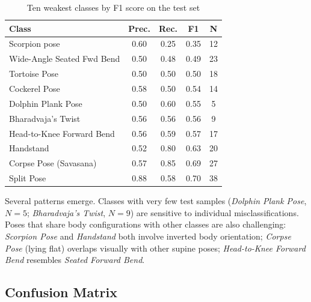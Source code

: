 \documentclass[conference]{IEEEtran}
\begin{document}
\begin{table}[htbp]
\caption{Ten weakest classes by F1 score on the test set}
\begin{center}
\begin{tabular}{|l|c|c|c|c|}
\hline
\textbf{Class} & \textbf{Prec.} & \textbf{Rec.} & \textbf{F1} & \textbf{N} \\
\hline
Scorpion pose              & 0.60 & 0.25 & 0.35 & 12 \\
Wide-Angle Seated Fwd Bend & 0.50 & 0.48 & 0.49 & 23 \\
Tortoise Pose              & 0.50 & 0.50 & 0.50 & 18 \\
Cockerel Pose              & 0.58 & 0.50 & 0.54 & 14 \\
Dolphin Plank Pose         & 0.50 & 0.60 & 0.55 &  5 \\
Bharadvaja's Twist         & 0.56 & 0.56 & 0.56 &  9 \\
Head-to-Knee Forward Bend  & 0.56 & 0.59 & 0.57 & 17 \\
Handstand                  & 0.52 & 0.80 & 0.63 & 20 \\
Corpse Pose (Savasana)     & 0.57 & 0.85 & 0.69 & 27 \\
Split Pose                 & 0.88 & 0.58 & 0.70 & 38 \\
\hline
\end{tabular}
\label{tab:weak}
\end{center}
\end{table}

Several patterns emerge. Classes with very few test samples (\textit{Dolphin Plank Pose}, $N=5$; \textit{Bharadvaja's Twist}, $N=9$) are sensitive to individual misclassifications. Poses that share body configurations with other classes are also challenging: \textit{Scorpion Pose} and \textit{Handstand} both involve inverted body orientation; \textit{Corpse Pose} (lying flat) overlaps visually with other supine poses; \textit{Head-to-Knee Forward Bend} resembles \textit{Seated Forward Bend}.

\subsection{Confusion Matrix}

\end{document}
